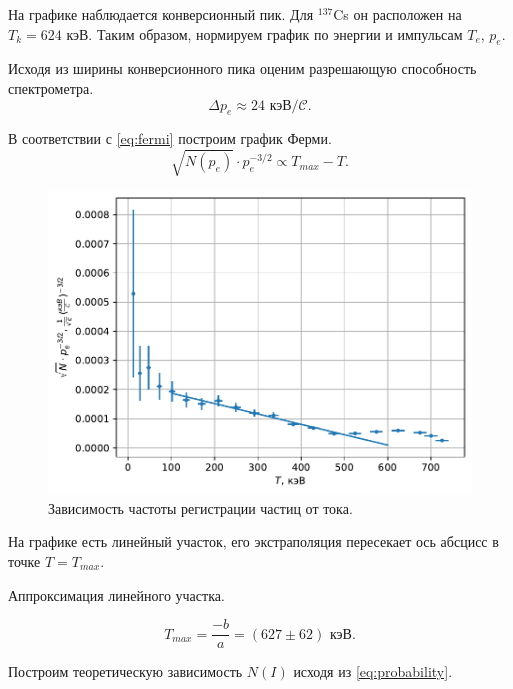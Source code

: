 \documentclass[a4paper, 12pt]{article} %
\begin{document}
	На графике наблюдается конверсионный пик. Для $^{137}$Cs он расположен на $T_k = 624$ кэВ. Таким образом, нормируем график по энергии и импульсам $T_e$, $p_e$.

	Исходя из ширины конверсионного пика оценим разрешающую способность спектрометра.
	$$ \Delta p_e \approx 24 \text{ кэВ}/\mathcal{C}.$$
	
	

	В соответствии с \eqref{eq:fermi} построим график Ферми.
	$$ \sqrt{N(p_e)} \cdot p_e^{-3/2} \propto T_{max} - T.$$

	\begin{figure}[h!]
		\centering
		\includegraphics[width=0.7\linewidth]{gen/fermi.pdf}
		\caption{Зависимость частоты регистрации частиц от тока.}
		\label{fig:exp_fermi}
	\end{figure}
	
	На графике есть линейный участок, его экстраполяция пересекает ось абсцисс в точке $T = T_{max}$.
	
	\begin{table}[h!]
		\footnotesize
		
		\caption{Аппроксимация линейного участка.}
		\label{tab:mnk}
	\end{table}
	
	$$T_{max} = \frac{-b}{a} = (627 \pm 62) \text{ кэВ}.$$
	
	Построим теоретическую зависимость $N(I)$ исходя из \eqref{eq:probability}.
	
\end{document}

